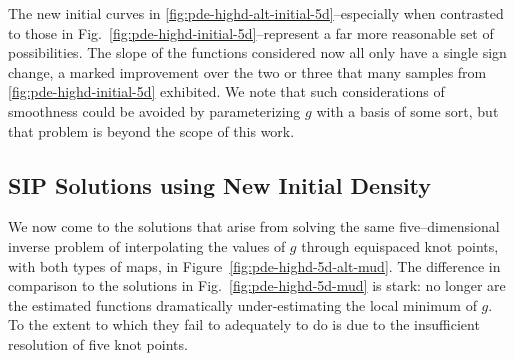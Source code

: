 The new initial curves in \ref{fig:pde-highd-alt-initial-5d}\---especially when contrasted to those in Fig.~\ref{fig:pde-highd-initial-5d}\---represent a far more reasonable set of possibilities.
The slope of the functions considered now all only have a single sign change, a marked improvement over the two or three that many samples from \ref{fig:pde-highd-initial-5d} exhibited.
We note that such considerations of smoothness could be avoided by parameterizing $g$ with a basis of some sort, but that problem is beyond the scope of this work.

\subsection{SIP Solutions using New Initial Density}
We now come to the solutions that arise from solving the same five--dimensional inverse problem of interpolating the values of $g$ through equispaced knot points, with both types of maps, in Figure~\ref{fig:pde-highd-5d-alt-mud}.
The difference in comparison to the solutions in Fig.~\ref{fig:pde-highd-5d-mud} is stark: no longer are the estimated functions dramatically under-estimating the local minimum of $g$.
To the extent to which they fail to adequately to do is due to the insufficient resolution of five knot points.

